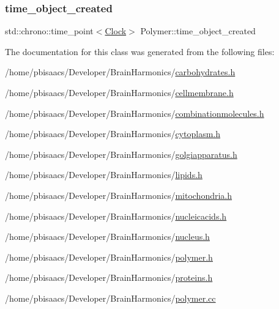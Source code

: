 \subsubsection{\texorpdfstring{time\+\_\+object\+\_\+created}{time\_object\_created}}
{\footnotesize\ttfamily std\+::chrono\+::time\+\_\+point$<$\mbox{\hyperlink{universe_8h_a0ef8d951d1ca5ab3cfaf7ab4c7a6fd80}{Clock}}$>$ Polymer\+::time\+\_\+object\+\_\+created\hspace{0.3cm}{\ttfamily [private]}}



The documentation for this class was generated from the following files\+:\begin{DoxyCompactItemize}
\item 
/home/pbisaacs/\+Developer/\+Brain\+Harmonics/\mbox{\hyperlink{carbohydrates_8h}{carbohydrates.\+h}}\item 
/home/pbisaacs/\+Developer/\+Brain\+Harmonics/\mbox{\hyperlink{cellmembrane_8h}{cellmembrane.\+h}}\item 
/home/pbisaacs/\+Developer/\+Brain\+Harmonics/\mbox{\hyperlink{combinationmolecules_8h}{combinationmolecules.\+h}}\item 
/home/pbisaacs/\+Developer/\+Brain\+Harmonics/\mbox{\hyperlink{cytoplasm_8h}{cytoplasm.\+h}}\item 
/home/pbisaacs/\+Developer/\+Brain\+Harmonics/\mbox{\hyperlink{golgiapparatus_8h}{golgiapparatus.\+h}}\item 
/home/pbisaacs/\+Developer/\+Brain\+Harmonics/\mbox{\hyperlink{lipids_8h}{lipids.\+h}}\item 
/home/pbisaacs/\+Developer/\+Brain\+Harmonics/\mbox{\hyperlink{mitochondria_8h}{mitochondria.\+h}}\item 
/home/pbisaacs/\+Developer/\+Brain\+Harmonics/\mbox{\hyperlink{nucleicacids_8h}{nucleicacids.\+h}}\item 
/home/pbisaacs/\+Developer/\+Brain\+Harmonics/\mbox{\hyperlink{nucleus_8h}{nucleus.\+h}}\item 
/home/pbisaacs/\+Developer/\+Brain\+Harmonics/\mbox{\hyperlink{polymer_8h}{polymer.\+h}}\item 
/home/pbisaacs/\+Developer/\+Brain\+Harmonics/\mbox{\hyperlink{proteins_8h}{proteins.\+h}}\item 
/home/pbisaacs/\+Developer/\+Brain\+Harmonics/\mbox{\hyperlink{polymer_8cc}{polymer.\+cc}}\end{DoxyCompactItemize}
